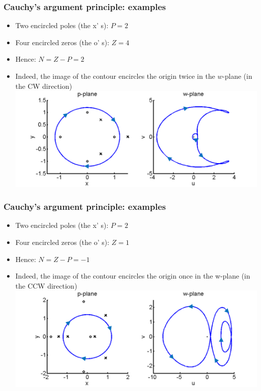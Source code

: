 \begin{frame}
\frametitle{Cauchy’s argument principle: examples}
\begin{itemize}
\item Two encircled poles (the x' s): $P=2$
\item Four encircled zeros (the o' s): $Z=4$
\item Hence: $N= Z-P= 2$
\item Indeed, the image of the contour encircles the origin twice in the $w$-plane (in the CW direction)
\includegraphics[width=0.9\linewidth]{Afbeelding6}
\end{itemize}
\end{frame}

\begin{frame}
\frametitle{Cauchy’s argument principle: examples}
\begin{itemize}
\item Two encircled poles (the x' s): $P=2$
\item Four encircled zeros (the o' s): $Z=1$
\item Hence: $N= Z-P= -1$
\item Indeed, the image of the contour encircles the origin once in the w-plane (in the CCW direction)
\includegraphics[width=0.9\linewidth]{Afbeelding7}
\end{itemize}
\end{frame}

